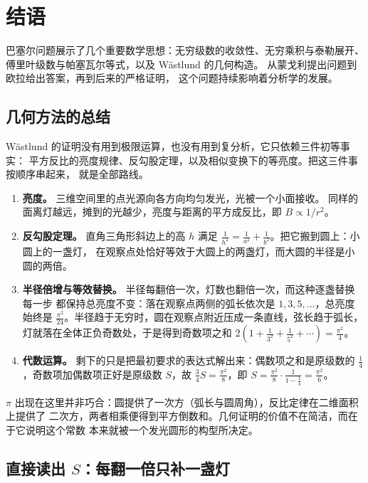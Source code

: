 \section{结语}

巴塞尔问题展示了几个重要数学思想：无穷级数的收敛性、无穷乘积与泰勒展开、
傅里叶级数与帕塞瓦尔等式，以及 Wästlund 的几何构造。
从蒙戈利提出问题到欧拉给出答案，再到后来的严格证明，
这个问题持续影响着分析学的发展。

\subsection{几何方法的总结}

Wästlund 的证明没有用到极限运算，也没有用到复分析，它只依赖三件初等事实：
平方反比的亮度规律、反勾股定理，以及相似变换下的等亮度。把这三件事按顺序串起来，
就是全部路线。

\begin{enumerate}
  \item \textbf{亮度。} 三维空间里的点光源向各方向均匀发光，光被一个小面接收。
        同样的面离灯越远，摊到的光越少，亮度与距离的平方成反比，即 $B\propto 1/r^{2}$。
  \item \textbf{反勾股定理。} 直角三角形斜边上的高 $h$ 满足
        $\frac{1}{h^{2}}=\frac{1}{a^{2}}+\frac{1}{b^{2}}$。把它搬到圆上：小圆上的一盏灯，
        在观察点处恰好等效于大圆上的两盏灯，而大圆的半径是小圆的两倍。
  \item \textbf{半径倍增与等效替换。} 半径每翻倍一次，灯数也翻倍一次，而这种逐盏替换每一步
        都保持总亮度不变：落在观察点两侧的弧长依次是 $1,3,5,\dots$，总亮度始终是
        $\frac{\pi^{2}}{24}$。半径趋于无穷时，圆在观察点附近压成一条直线，弦长趋于弧长，
        灯就落在全体正负奇数处，于是得到奇数项之和
        $2\left(1+\frac{1}{3^{2}}+\frac{1}{5^{2}}+\cdots\right)=\frac{\pi^{2}}{4}$。
  \item \textbf{代数运算。} 剩下的只是把最初要求的表达式解出来：偶数项之和是原级数的
        $\frac14$，奇数项加偶数项正好是原级数 $S$，故 $\frac34 S=\frac{\pi^{2}}{8}$，即
        $S=\frac{\pi^{2}}{8}\cdot\frac{1}{1-\frac14}=\frac{\pi^{2}}{6}$。
\end{enumerate}

$\pi$ 出现在这里并非巧合：圆提供了一次方（弧长与圆周角），反比定律在二维面积上提供了
二次方，两者相乘便得到平方倒数和。几何证明的价值不在简洁，而在于它说明这个常数
本来就被一个发光圆形的构型所决定。

\subsection{直接读出 $S$：每翻一倍只补一盏灯}

